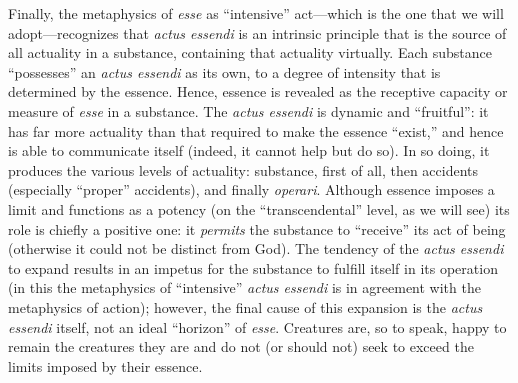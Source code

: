 Finally, the metaphysics of \emph{esse} as ``intensive'' act---which is the one that we will adopt---recognizes that \emph{actus essendi} is an intrinsic principle that is the source of all actuality in a substance, containing that actuality virtually. Each substance ``possesses'' an \emph{actus essendi} as its own, to a degree of intensity that is determined by the essence. Hence, essence is revealed as the receptive capacity or measure of \emph{esse} in a substance. The \emph{actus essendi} is dynamic and ``fruitful'': it has far more actuality than that required to make the essence ``exist,'' and hence is able to communicate itself (indeed, it cannot help but do so). In so doing, it produces the various levels of actuality: substance, first of all, then accidents (especially ``proper'' accidents), and finally \emph{operari}. Although essence imposes a limit and functions as a potency (on the ``transcendental'' level, as we will see) its role is chiefly a positive one: it \emph{permits} the substance to ``receive'' its act of being (otherwise it could not be distinct from God). The tendency of the \emph{actus essendi} to expand results in an impetus for the substance to fulfill itself in its operation (in this the metaphysics of ``intensive'' \emph{actus essendi} is in agreement with the metaphysics of action); however, the final cause of this expansion is the \emph{actus essendi} itself, not an ideal ``horizon'' of \emph{esse}. Creatures are, so to speak, happy to remain the creatures they are and do not (or should not) seek to exceed the limits imposed by their essence.

